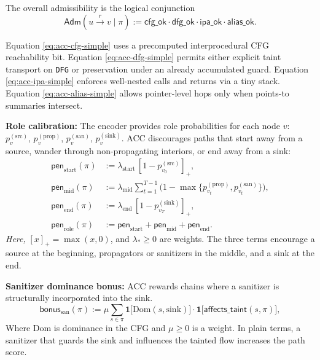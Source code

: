 \documentclass{buthesis}
\begin{document}
The overall admissibility is the logical conjunction
\begin{equation}
\label{eq:acc-admiss}
\mathsf{Adm}(u\xrightarrow{r}v \mid \pi)
:= \mathsf{cfg\_ok}\cdot \mathsf{dfg\_ok}\cdot \mathsf{ipa\_ok}\cdot \mathsf{alias\_ok}.
\end{equation}

Equation \eqref{eq:acc-cfg-simple} uses a precomputed interprocedural CFG reachability bit. Equation \eqref{eq:acc-dfg-simple} permits either explicit taint transport on \texttt{DFG} or preservation under an already accumulated guard. Equation \eqref{eq:acc-ipa-simple} enforces well-nested calls and returns via a tiny stack. Equation \eqref{eq:acc-alias-simple} allows pointer-level hops only when points-to summaries intersect.

\textbf{Role calibration:}
The encoder provides role probabilities for each node $v$: $p_v^{(\mathrm{src})}$, $p_v^{(\mathrm{prop})}$, $p_v^{(\mathrm{san})}$, $p_v^{(\mathrm{sink})}$. ACC discourages paths that start away from a source, wander through non-propagating interiors, or end away from a sink:
\begin{align}
\label{eq:acc-role-start}
\mathsf{pen}_{\mathrm{start}}(\pi) &:= \lambda_{\mathrm{start}}\,[1-p_{v_0}^{(\mathrm{src})}]_+,\\
\label{eq:acc-role-mid}
\mathsf{pen}_{\mathrm{mid}}(\pi) &:= \lambda_{\mathrm{mid}} \sum_{t=1}^{T-1}\!\Big(1-\max\{p_{v_t}^{(\mathrm{prop})},p_{v_t}^{(\mathrm{san})}\}\Big),\\
\label{eq:acc-role-end}
\mathsf{pen}_{\mathrm{end}}(\pi) &:= \lambda_{\mathrm{end}}\,[1-p_{v_T}^{(\mathrm{sink})}]_+,\\
\label{eq:acc-role-total}
\mathsf{pen}_{\mathrm{role}}(\pi) &:= \mathsf{pen}_{\mathrm{start}}+\mathsf{pen}_{\mathrm{mid}}+\mathsf{pen}_{\mathrm{end}}.
\end{align}
\emph{Here,} $[x]_+=\max(x,0)$, and $\lambda_{\ast}\!\ge\!0$ are weights. The three terms encourage a source at the beginning, propagators or sanitizers in the middle, and a sink at the end.

\textbf{Sanitizer dominance bonus:}
ACC rewards chains where a sanitizer is structurally incorporated into the sink.
\begin{equation}
\label{eq:acc-san-bonus}
\mathsf{bonus}_{\mathrm{san}}(\pi)
:= \mu \sum_{s\in\pi}
\mathbf{1}\!\big[\mathrm{Dom}(s,\mathrm{sink})\big]\cdot
\mathbf{1}\!\big[\mathsf{affects\_taint}(s,\pi)\big],
\end{equation}
Where $\mathrm{Dom}$ is dominance in the CFG and $\mu\!\ge\!0$ is a weight. In plain terms, a sanitizer that guards the sink and influences the tainted flow increases the path score.
\end{document}
